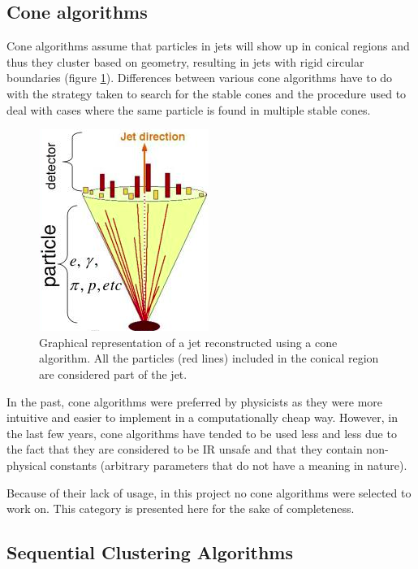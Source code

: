     \subsection{Cone algorithms}
    Cone algorithms assume that particles in jets will show up in conical regions and thus they cluster based on geometry, resulting in jets with rigid circular boundaries (figure \ref{fig:cone}). Differences between various cone algorithms have to do with the strategy taken to search for the stable cones and the procedure used to deal with cases where the same particle is found in multiple stable cones\cite{cacciari2012fastjet}.

\begin{figure}[H]
    \centering
    \includegraphics[width=0.4\linewidth]{images/cone_alg.png}
    \caption{Graphical representation of a jet reconstructed using a cone algorithm. All the particles (red lines) included in the conical region are considered part of the jet.}
    \label{fig:cone}
\end{figure}

        In the past, cone algorithms were preferred by physicists as they were more intuitive and easier to implement in a computationally cheap way. However, in the last few years, cone algorithms have tended to be used less and less due to the fact that they are considered to be IR unsafe and that they contain non-physical constants (arbitrary parameters that do not have a meaning in nature). 
        
        Because of their lack of usage, in this project no cone algorithms were selected to work on. This category is presented here for the sake of completeness. 

    \subsection{Sequential Clustering Algorithms}\label{ch:seq}

